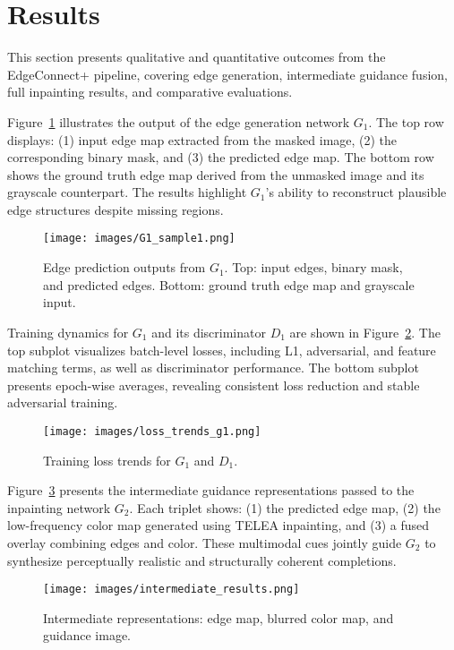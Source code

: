 \section{Results}
\label{sec:results}

This section presents qualitative and quantitative outcomes from the EdgeConnect+ pipeline, covering edge generation, intermediate guidance fusion, full inpainting results, and comparative evaluations.

Figure~\ref{fig:g1_sample1_1} illustrates the output of the edge generation network \(G_1\). The top row displays: (1) input edge map extracted from the masked image, (2) the corresponding binary mask, and (3) the predicted edge map. The bottom row shows the ground truth edge map derived from the unmasked image and its grayscale counterpart. The results highlight \(G_1\)'s ability to reconstruct plausible edge structures despite missing regions.

\begin{figure}[h]
\centering
\texttt{[image: images/G1\_sample1.png]}
\caption{Edge prediction outputs from \(G_1\). Top: input edges, binary mask, and predicted edges. Bottom: ground truth edge map and grayscale input.}
\label{fig:g1_sample1_1}
\end{figure}

Training dynamics for \(G_1\) and its discriminator \(D_1\) are shown in Figure~\ref{fig:loss_trends}. The top subplot visualizes batch-level losses, including L1, adversarial, and feature matching terms, as well as discriminator performance. The bottom subplot presents epoch-wise averages, revealing consistent loss reduction and stable adversarial training.

\begin{figure}[h]
\centering
\texttt{[image: images/loss\_trends\_g1.png]}
\caption{Training loss trends for \(G_1\) and \(D_1\).}
\label{fig:loss_trends}
\end{figure}

Figure~\ref{fig:intermediate_outputs} presents the intermediate guidance representations passed to the inpainting network \(G_2\). Each triplet shows: (1) the predicted edge map, (2) the low-frequency color map generated using TELEA inpainting, and (3) a fused overlay combining edges and color. These multimodal cues jointly guide \(G_2\) to synthesize perceptually realistic and structurally coherent completions.

\begin{figure}[h]
\centering
\texttt{[image: images/intermediate\_results.png]}
\caption{Intermediate representations: edge map, blurred color map, and guidance image.}
\label{fig:intermediate_outputs}
\end{figure}

